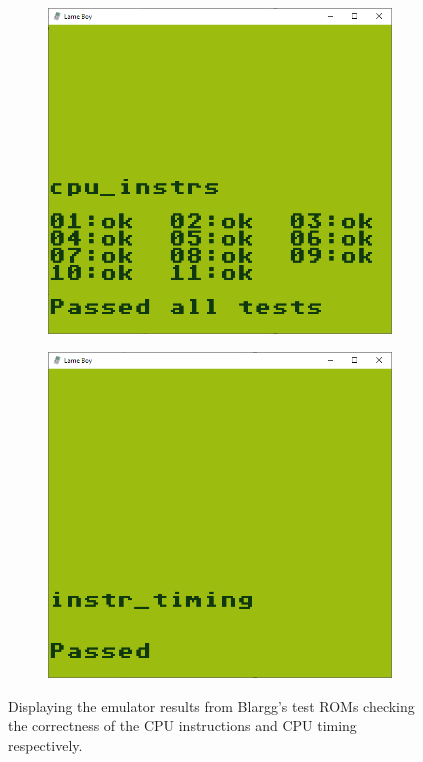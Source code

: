 \begin{figure}[H]
\centering
\begin{subfigure}{.5\textwidth}
  \centering
  \includegraphics[width=0.9\linewidth]{figures/cpu_instrs_passed.PNG}
\end{subfigure}%
\begin{subfigure}{.5\textwidth}
  \centering
  \includegraphics[width=0.9\linewidth]{figures/instr_timing_passed.PNG}
\end{subfigure}
\caption{Displaying the emulator results from  Blargg's test ROMs checking the correctness of the CPU instructions and CPU timing respectively.}
\label{fig:cputests}
\end{figure}   


